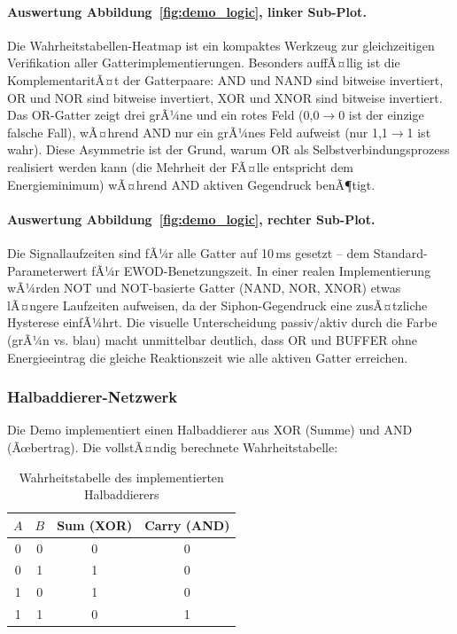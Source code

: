 ﻿\documentclass[a4paper,12pt]{scrreprt}
\theoremstyle{definition}
\begin{document}
\paragraph{Auswertung Abbildung~\ref{fig:demo_logic}, linker Sub-Plot.}
Die Wahrheitstabellen-Heatmap ist ein kompaktes Werkzeug zur gleichzeitigen
Verifikation aller Gatterimplementierungen. Besonders auffÃ¤llig ist die
KomplementaritÃ¤t der Gatterpaare: AND und NAND sind bitweise invertiert,
OR und NOR sind bitweise invertiert, XOR und XNOR sind bitweise invertiert.
Das OR-Gatter zeigt drei grÃ¼ne und ein rotes Feld (0,0$\to$0 ist der einzige
falsche Fall), wÃ¤hrend AND nur ein grÃ¼nes Feld aufweist (nur 1,1$\to$1 ist wahr).
Diese Asymmetrie ist der Grund, warum OR als Selbstverbindungsprozess realisiert
werden kann (die Mehrheit der FÃ¤lle entspricht dem Energieminimum) wÃ¤hrend AND
aktiven Gegendruck benÃ¶tigt.

\paragraph{Auswertung Abbildung~\ref{fig:demo_logic}, rechter Sub-Plot.}
Die Signallaufzeiten sind fÃ¼r alle Gatter auf 10\,ms gesetzt -- dem Standard-Parameterwert
fÃ¼r EWOD-Benetzungszeit. In einer realen Implementierung wÃ¼rden NOT und NOT-basierte
Gatter (NAND, NOR, XNOR) etwas lÃ¤ngere Laufzeiten aufweisen, da der Siphon-Gegendruck
eine zusÃ¤tzliche Hysterese einfÃ¼hrt. Die visuelle Unterscheidung passiv/aktiv
durch die Farbe (grÃ¼n vs. blau) macht unmittelbar deutlich, dass OR und BUFFER
ohne Energieeintrag die gleiche Reaktionszeit wie alle aktiven Gatter erreichen.

\subsubsection{Halbaddierer-Netzwerk}

Die Demo implementiert einen Halbaddierer aus XOR (Summe) und AND (Ãœbertrag).
Die vollstÃ¤ndig berechnete Wahrheitstabelle:

\begin{table}[H]
	\centering
	\caption{Wahrheitstabelle des implementierten Halbaddierers}
	\label{tab:halbaddierer}
	\begin{tabular}{cccc}
		\toprule
		$A$ & $B$ & Sum (XOR) & Carry (AND) \\
		\midrule
		0 & 0 & 0 & 0 \\
		0 & 1 & 1 & 0 \\
		1 & 0 & 1 & 0 \\
		1 & 1 & 0 & 1 \\
		\bottomrule
	\end{tabular}
\end{table}
\end{document}

